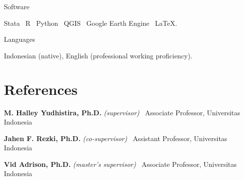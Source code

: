 \documentclass[11pt,a4paper]{article}
\newlength{\datecol}\setlength{\datecol}{0.155\textwidth}
\newlength{\bodycol}\setlength{\bodycol}{0.815\textwidth}
\newcommand{\entry}[2]{%
  \noindent
  \begin{minipage}[t]{\datecol}%
    \strut\raggedright\small\color{muted}#1%
  \end{minipage}%
  \hfill
  \begin{minipage}[t]{\bodycol}%
    \strut #2%
  \end{minipage}%
  \par\vspace{0.16em}}
\newcommand{\fentry}[1]{\noindent#1\par\vspace{0.16em}}
\newcommand{\org}[1]{{\small\color{muted}#1}}
\begin{document}
\entry{Software}{Stata \textperiodcentered\ R \textperiodcentered\ Python
  \textperiodcentered\ QGIS \textperiodcentered\ Google Earth Engine
  \textperiodcentered\ \LaTeX.}

\entry{Languages}{Indonesian (native), English (professional working
  proficiency).}

\section{References}
{\small

\fentry{\textbf{M. Halley Yudhistira, Ph.D.} \emph{(supervisor)}
  \textperiodcentered\
  \org{Associate Professor, Universitas Indonesia}}

\fentry{\textbf{Jahen F. Rezki, Ph.D.} \emph{(co-supervisor)}
  \textperiodcentered\
  \org{Assistant Professor, Universitas Indonesia}}

\fentry{\textbf{Vid Adrison, Ph.D.} \emph{(master's supervisor)}
  \textperiodcentered\
  \org{Associate Professor, Universitas Indonesia}}

}
\end{document}
